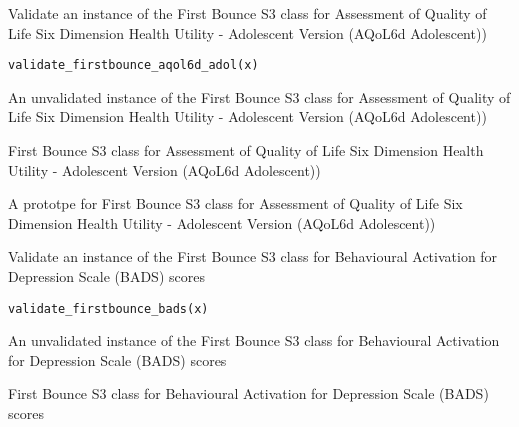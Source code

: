 \documentclass[a4paper]{book}
\begin{document}
%
\begin{Description}\relax
Validate an instance of the First Bounce S3 class for Assessment of Quality of Life Six Dimension Health Utility - Adolescent Version (AQoL6d Adolescent))
\end{Description}
%
\begin{Usage}
\begin{verbatim}
validate_firstbounce_aqol6d_adol(x)
\end{verbatim}
\end{Usage}
%
\begin{Arguments}
\begin{ldescription}
\item[\code{x}] An unvalidated instance of the First Bounce S3 class for Assessment of Quality of Life Six Dimension Health Utility - Adolescent Version (AQoL6d Adolescent))
\end{ldescription}
\end{Arguments}
%
\begin{Details}\relax
First Bounce S3 class for Assessment of Quality of Life Six Dimension Health Utility - Adolescent Version (AQoL6d Adolescent))
\end{Details}
%
\begin{Value}
A prototpe for First Bounce S3 class for Assessment of Quality of Life Six Dimension Health Utility - Adolescent Version (AQoL6d Adolescent))
\end{Value}
%
\begin{Description}\relax
Validate an instance of the First Bounce S3 class for Behavioural Activation for Depression Scale (BADS) scores
\end{Description}
%
\begin{Usage}
\begin{verbatim}
validate_firstbounce_bads(x)
\end{verbatim}
\end{Usage}
%
\begin{Arguments}
\begin{ldescription}
\item[\code{x}] An unvalidated instance of the First Bounce S3 class for Behavioural Activation for Depression Scale (BADS) scores
\end{ldescription}
\end{Arguments}
%
\begin{Details}\relax
First Bounce S3 class for Behavioural Activation for Depression Scale (BADS) scores
\end{Details}
\end{document}
